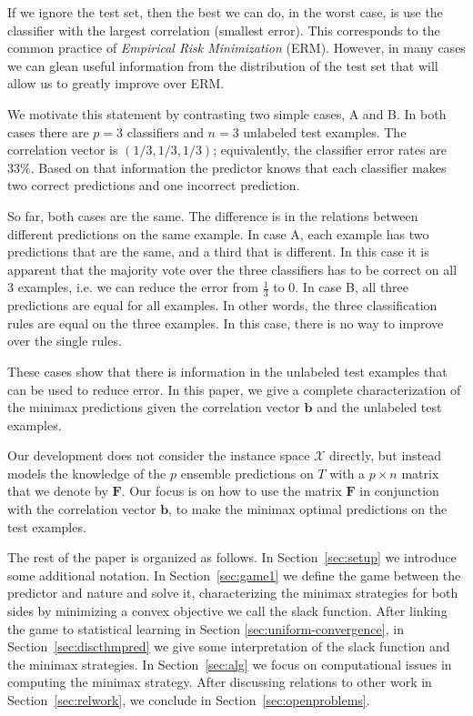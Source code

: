 \documentclass{colt2015} %
\newcommand{\vF}{\mathbf{F}}
\newcommand{\vb}{\mathbf{b}}
\newcommand{\cX}{\mathcal{X}}
\begin{document}
If we ignore the test set, then the best we can do, in the worst case,
is use the classifier with the largest correlation (smallest error).
This corresponds to the common practice of {\em Empirical Risk
  Minimization} (ERM).  However, in many cases we can glean useful
information from the distribution of the test set that will allow us
to greatly improve over ERM.

We motivate this statement by contrasting two simple cases, A and B. 
In both cases there are $p=3$ classifiers and $n=3$ unlabeled test
examples. The correlation vector is $(1/3,1/3,1/3)$; equivalently,
the classifier error rates are $33\%$.  Based on that information the predictor
knows that each classifier makes two correct predictions and one
incorrect prediction.

So far, both cases are the same. The difference is in the relations
between different predictions on the same example.  In case A, each
example has two predictions that are the same, and a third that is
different.  In this case it is apparent that the majority vote
over the three classifiers has to be correct on all 3 examples,
i.e. we can reduce the error from $\frac{1}{3}$ to $0$. In case B, all
three predictions are equal for all examples. In other words, the
three classification rules are equal on the three examples. In this
case, there is no way to improve over the single rules.

These cases show that there is information in the unlabeled test
examples that can be used to reduce error. In this paper, we give a
complete characterization of the minimax predictions given the
correlation vector $\vb$ and the unlabeled test examples.

Our development does not consider the instance space $\cX$ directly, 
but instead models the knowledge of the $p$ ensemble predictions on $T$ 
with a $p \times n$ matrix that we denote by $\vF$. Our focus is on
how to use the matrix $\vF$ in conjunction with the correlation
vector $\vb$, to make the minimax optimal predictions on the test examples.  

The rest of the paper is organized as follows.  In
Section~\ref{sec:setup} we introduce some additional notation.  In
Section~\ref{sec:game1} we define the game between the predictor and
nature and solve it, characterizing the minimax strategies for both
sides by minimizing a convex objective we call the slack function. 
After linking the game to statistical learning in Section \ref{sec:uniform-convergence}, in
Section~\ref{sec:discthmpred} we give some interpretation of the slack
function and the minimax strategies. In Section~\ref{sec:alg} we
focus on computational issues in computing the minimax strategy.  After discussing relations to other work in
Section~\ref{sec:relwork}, we conclude in
Section~\ref{sec:openproblems}.
\end{document}
